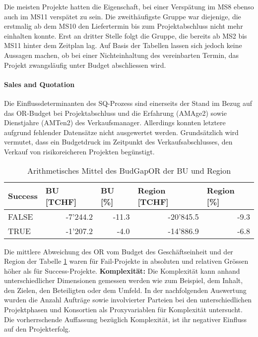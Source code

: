 Die meisten Projekte hatten die Eigenschaft, bei einer Verspätung im MS8 ebenso auch im MS11 verspätet zu sein. Die zweithäufigste Gruppe war diejenige, die erstmalig ab dem MS10 den Liefertermin bis zum Projektabschluss nicht mehr einhalten konnte. Erst an dritter Stelle folgt die Gruppe, die bereits ab MS2 bis MS11 hinter dem Zeitplan lag. Auf Basis der Tabellen lassen sich jedoch keine Aussagen machen, ob bei einer Nichteinhaltung des vereinbarten Termin, das Projekt zwangsläufig unter Budget abschliessen wird. 
\paragraph[short title]{Sales and Quotation} Die Einflussdeterminanten des SQ-Prozess sind einerseits der Stand im Bezug auf das OR-Budget bei Projektabschluss und die Erfahrung (AMAge2) sowie Dienstjahre (AMTen2) des Verkaufsmanager. Allerdings konnten letztere aufgrund fehlender Datensätze nicht ausgewertet werden. Grundsätzlich wird vermutet, dass ein Budgetdruck im Zeitpunkt des Verkaufsabschlusses, den Verkauf von risikoreicheren Projekten begünstigt. 
\begin{table}[H]
	\centering
	\caption{Arithmetisches Mittel des BudGapOR der BU und Region}
	\begin{tabular}{lrr|rr}
		\textbf{Success} & \multicolumn{1}{l}{\textbf{BU [TCHF]}} & \multicolumn{1}{l}{\textbf{BU [\%]}} & \multicolumn{1}{l}{\textbf{Region [TCHF]}} & \multicolumn{1}{l}{\textbf{Region [\%]}} \\\hline
		FALSE & -7'244.2 & -11.3 & -20'845.5 & -9.3 \\
		TRUE  & -1'207.2 & -4.0  & -14'886.9 & -6.8 \\
	\end{tabular}%
	\label{msq}%
\end{table}%
Die mittlere Abweichung des OR vom Budget des Geschäftseinheit und der Region der Tabelle \ref{msq} waren für Fail-Projekte in absoluten und relativen Grössen höher als für Success-Projekte.  
\newline\newline\textbf{Komplexität:} Die Komplexität kann anhand unterschiedlicher Dimensionen gemessen werden wie zum Beispiel, dem Inhalt, den Zielen, den Beteiligten oder dem Umfeld. In der nachfolgenden Auswertung wurden die Anzahl Aufträge sowie involvierter Parteien bei den unterschiedlichen Projektphasen und Konsortien als Proxyvariablen für Komplexität untersucht. Die vorherrschende Auffassung bezüglich Komplexität, ist ihr negativer Einfluss auf den Projekterfolg.
